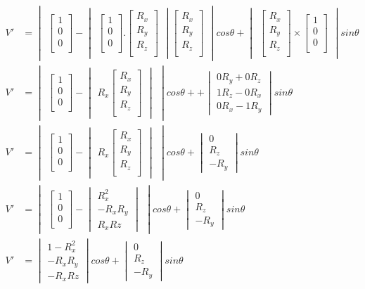 \documentclass{article}
\newcommand{\xaxis}{
    \begin{bmatrix}
        1 \\
        0 \\
        0 \\
    \end{bmatrix}
}
\newcommand{\rotAxis}{
    \begin{bmatrix}
        R_x \\
        R_y \\
        R_z \\
    \end{bmatrix}
}
\begin{document}
    \begin{align}
        V' &= \begin{vmatrix}\xaxis - \begin{vmatrix}\xaxis.\rotAxis\end{vmatrix} \rotAxis\end{vmatrix}cos\theta +
        \begin{vmatrix}\rotAxis \times \xaxis \end{vmatrix}sin\theta \\
        V' &= \begin{vmatrix} \xaxis - \begin{vmatrix} R_x \rotAxis \end{vmatrix} \end{vmatrix}cos\theta + +
        \begin{vmatrix} 0R_y+0R_z\\ 1R_z-0R_x\\ 0R_x-1R_y \end{vmatrix}sin\theta \\
        V' &= \begin{vmatrix} \xaxis - \begin{vmatrix} R_x \rotAxis \end{vmatrix} \end{vmatrix}cos\theta +
        \begin{vmatrix} 0\\ R_z \\ -R_y \end{vmatrix}sin\theta\\
        V' &=
        \begin{vmatrix} \xaxis -
        \begin{vmatrix} R_x^2 \\ -R_xR_y \\ R_xRz \end{vmatrix}\end{vmatrix}cos\theta +
        \begin{vmatrix} 0\\ R_z \\ -R_y \end{vmatrix}sin\theta\\
        V' &=
        \begin{vmatrix} 1-R_x^2 \\ -R_xR_y \\ -R_xRz \end{vmatrix}cos\theta +
        \begin{vmatrix} 0\\ R_z \\ -R_y \end{vmatrix}sin\theta\\

\end{align}
\end{document}
